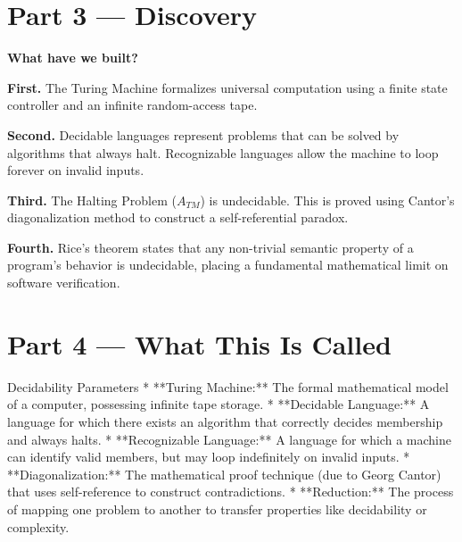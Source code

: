 \documentclass[12pt, a4paper]{book}
\begin{document}
\newpage

\section{Part 3 --- Discovery}

\begin{discoverybox}
\textbf{What have we built?}

\textbf{First.} The Turing Machine formalizes universal computation using a finite state controller and an infinite random-access tape.

\textbf{Second.} Decidable languages represent problems that can be solved by algorithms that always halt. Recognizable languages allow the machine to loop forever on invalid inputs.

\textbf{Third.} The Halting Problem ($A_{TM}$) is undecidable. This is proved using Cantor's diagonalization method to construct a self-referential paradox.

\textbf{Fourth.} Rice's theorem states that any non-trivial semantic property of a program's behavior is undecidable, placing a fundamental mathematical limit on software verification.
\end{discoverybox}

\newpage

\section{Part 4 --- What This Is Called}

\begin{namedconcept}{Decidability Parameters}
* **Turing Machine:** The formal mathematical model of a computer, possessing infinite tape storage.
* **Decidable Language:** A language for which there exists an algorithm that correctly decides membership and always halts.
* **Recognizable Language:** A language for which a machine can identify valid members, but may loop indefinitely on invalid inputs.
* **Diagonalization:** The mathematical proof technique (due to Georg Cantor) that uses self-reference to construct contradictions.
* **Reduction:** The process of mapping one problem to another to transfer properties like decidability or complexity.
\end{namedconcept}

\newpage

\end{document}

